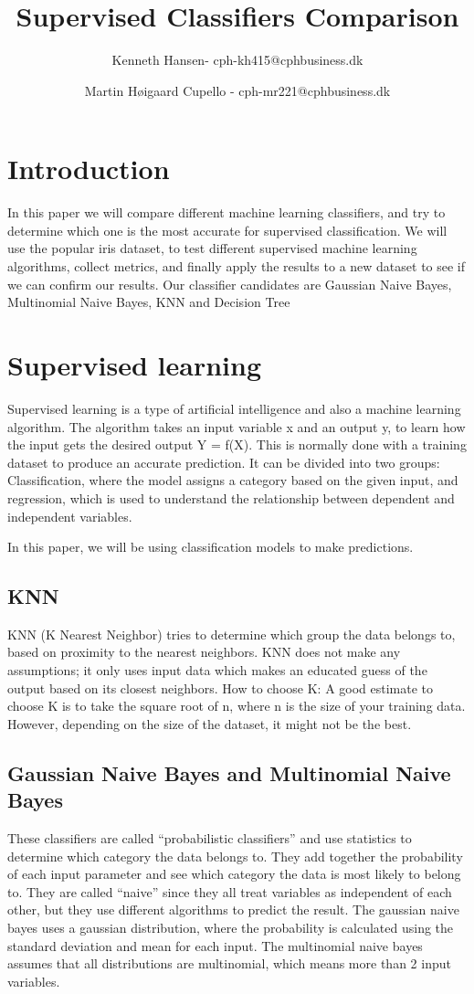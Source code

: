 \documentclass{article}
\author{Kenneth Hansen- cph-kh415@cphbusiness.dk
    \and Martin Høigaard Cupello - cph-mr221@cphbusiness.dk}
\title{Supervised Classifiers Comparison}
\begin{document}
\maketitle
\thispagestyle{empty}
\tableofcontents
\clearpage

\section{Introduction}
In this paper we will compare different machine learning classifiers, and try to determine which one is the most accurate for supervised classification. We will use the popular iris dataset, to test different supervised machine learning algorithms, collect metrics, and finally apply the results to a new dataset to see if we can confirm our results.
Our classifier candidates are Gaussian Naive Bayes, Multinomial Naive Bayes, KNN and Decision Tree


\section{Supervised learning}
Supervised learning is a type of artificial intelligence and also a machine learning algorithm. The algorithm takes an input variable x and an output y, to learn how the input gets the desired output Y = f(X). This is normally done with a training dataset to produce an accurate prediction. It can be divided into two groups: Classification, where the model assigns a category based on the given input,  and regression, which is used to understand the relationship between dependent and independent variables.

In this paper, we will be using classification models to make predictions.

\subsection{KNN}
KNN (K Nearest Neighbor) tries to determine which group the data belongs to, based on proximity to the nearest neighbors.
KNN does not make any assumptions; it only uses input data which makes an educated guess of the output based on its closest neighbors.
How to choose K:
A good estimate to choose K is to take the square root of n, where n is the size of your training data. However, depending on the size of the dataset, it might not be the best.

\subsection{Gaussian Naive Bayes and Multinomial Naive Bayes}
These classifiers are called “probabilistic classifiers” and use statistics to determine which category the data belongs to. They add together the probability of each input parameter and see which category the data is most likely to belong to. They are called “naive” since they all treat variables as independent of each other, but they use different algorithms to predict the result.
The gaussian naive bayes uses a gaussian distribution, where the probability is calculated using the standard deviation and mean for each input.
The multinomial naive bayes assumes that all distributions are multinomial, which means more than 2 input variables.
\end{document}
